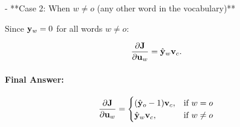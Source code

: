 \begin{parts}
{- **Case 2: When $w \neq o$ (any other word in the vocabulary)**

  Since $\mathbf{y}_w = 0$ for all words $w \neq o$:

  \[
  \frac{\partial \mathbf{J}}{\partial \mathbf{u}_w} = \hat{\mathbf{y}}_w \mathbf{v}_c.
  \]

\paragraph{Final Answer:}
\[
\frac{\partial \mathbf{J}}{\partial \mathbf{u}_w} =
\begin{cases}
(\hat{\mathbf{y}}_o - 1) \mathbf{v}_c, & \text{if } w = o \\
\hat{\mathbf{y}}_w \mathbf{v}_c, & \text{if } w \neq o
\end{cases}
\]

}

\end{parts}